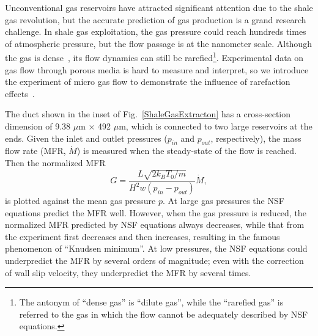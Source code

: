 Unconventional gas reservoirs have attracted significant attention due to the shale gas revolution, but the accurate prediction of gas production is a grand research challenge. In shale gas exploitation, the gas pressure could reach hundreds times of atmospheric pressure, but the flow passage is at the nanometer scale. Although the gas is dense~\cite{Lei2015Enskog,Wu2016JFM}, its flow dynamics can still be rarefied\footnote{The antonym of ``dense gas'' is ``dilute gas'', while the ``rarefied gas'' is referred to the gas in which the flow cannot be adequately described by NSF equations.}. Experimental data on gas flow through  porous media is hard to measure and interpret, so we introduce the experiment of micro gas flow to demonstrate the influence of rarefaction effects~\cite{Ewart2007}.


The duct shown in the inset of Fig.~\ref{ShaleGasExtracton} has a cross-section dimension of 9.38 $\mu$m $\times$ 492 $\mu$m, which is connected to two large reservoirs at the ends. Given the inlet and outlet pressures ($p_{in}$ and $p_{out}$, respectively), the mass flow rate (MFR, $\dot{M}$) is measured when the steady-state of the flow is reached. Then the normalized MFR 
\begin{equation}
	G=\frac{L\sqrt{2k_BT_0/m}}{H^2w(p_{in}-p_{out})}\dot{M},
\end{equation}
is plotted against the mean gas pressure $p$. At large gas pressures the NSF equations predict the MFR well. However, when the gas pressure is reduced, the normalized MFR predicted by NSF equations always decreases, while that from the experiment first decreases and then increases, resulting in the famous phenomenon of  ``Knudsen minimum''. At low pressures, the NSF equations could underpredict the MFR by several orders of magnitude; even with the correction of wall slip velocity, they underpredict the MFR by several times.  


